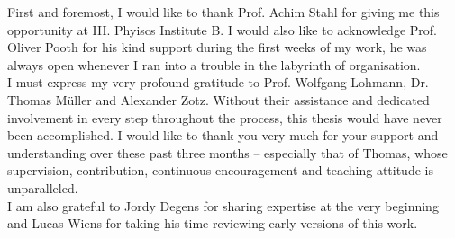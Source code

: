 \documentclass[
11pt, %
english, %
singlespacing, %
headsepline, %
]{MastersDoctoralThesis} %
\begin{document}
\begin{comment}
\begin{abstract}
\addchaptertocentry{\abstractname} %
The Thesis Abstract is written here (and usually kept to just this page). The page is kept centered vertically so can expand into the blank space above the title too\ldots
\end{abstract}
\end{comment}

\begin{acknowledgements}
\addchaptertocentry{\acknowledgementname} %
First and foremost, I would like to thank Prof. Achim Stahl for giving me this opportunity at III. Phyiscs Institute B. I would also like to acknowledge Prof. Oliver Pooth for his kind support during the first weeks of my work, he was always open whenever I ran into a trouble in the labyrinth of organisation.\\
I must express my very profound gratitude to Prof. Wolfgang Lohmann, Dr. Thomas Müller and Alexander Zotz. Without their assistance and dedicated involvement in every step throughout the process, this thesis would have never been accomplished. I would like to thank you very much for your support and understanding over these past three months -- especially that of Thomas, whose supervision, contribution, continuous encouragement and teaching attitude is unparalleled.\\
I am also grateful to Jordy Degens for sharing expertise at the very beginning and Lucas Wiens for taking his time reviewing early versions of this work.
\end{acknowledgements}


\tableofcontents %

\iffalse
\listoffigures %
\end{document}
